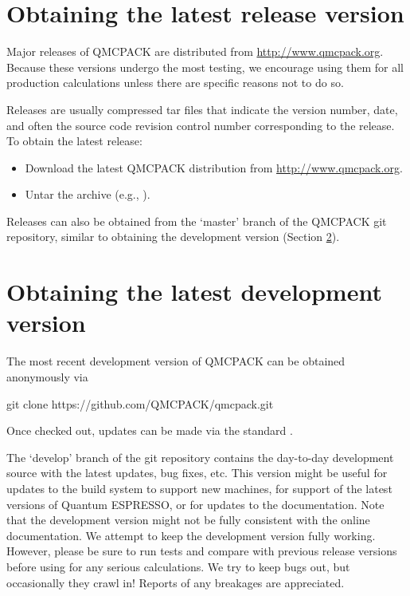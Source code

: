 \section{Obtaining the latest release version}
\label{sec:obrelease}
Major releases of QMCPACK are distributed from
\url{http://www.qmcpack.org}. Because these versions undergo the most testing, we encourage using them for all production calculations unless there are specific reasons not to do so.

Releases are usually compressed tar files that indicate the version
number, date, and often the source code revision control number
corresponding to the release. To obtain the latest release: 

\begin{itemize}
\item Download the latest QMCPACK distribution from \url{http://www.qmcpack.org}.
\item Untar the archive (e.g., ).
\end{itemize}

Releases can also be obtained from the `master' branch of the QMCPACK
git repository, similar to obtaining the development version (Section \ref{sec:obdevelopment}).

\section{Obtaining the latest development version}
\label{sec:obdevelopment}
The most recent development version of QMCPACK can be obtained anonymously via
\begin{shade}
git clone https://github.com/QMCPACK/qmcpack.git
\end{shade}
Once checked out,
updates can be made via the standard .

The `develop' branch of the git repository contains the day-to-day development source
with the latest updates, bug fixes, etc. This version might be useful
for updates to the build system to support new machines, for support
of the latest versions of Quantum ESPRESSO, or for updates to the
documentation.  Note that the development version might not be fully
consistent with the online documentation.  We attempt to keep
the development version fully working. However, please be sure to run tests and
compare with previous release versions before using for any serious
calculations. We try to keep bugs out, but occasionally they crawl
in! Reports of any breakages are appreciated.

